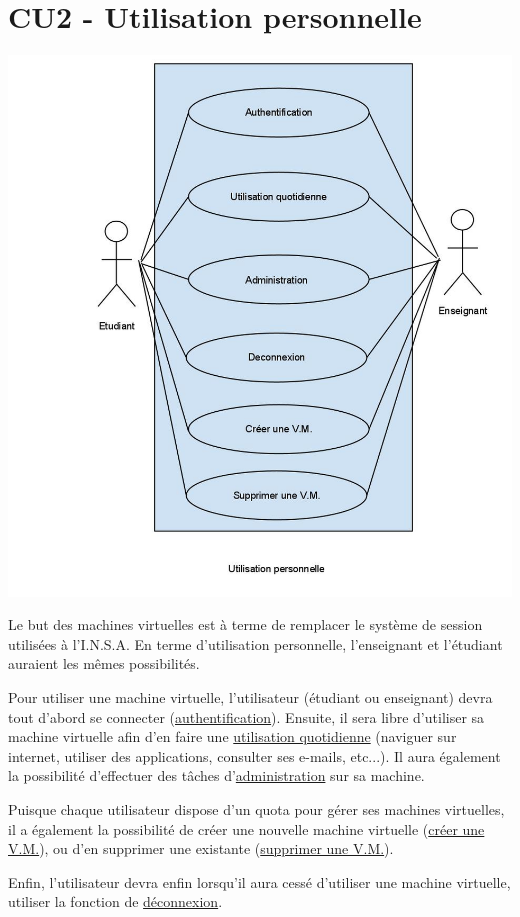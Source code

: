 \section{CU2 - Utilisation personnelle}

\includegraphics[scale=0.4]{CU2.jpg}

Le but des machines virtuelles est à terme de remplacer le système de session utilisées à l’I.N.S.A.
En terme d’utilisation personnelle, l’enseignant et l’étudiant auraient les mêmes possibilités.

Pour utiliser une machine virtuelle, l’utilisateur (étudiant ou enseignant) devra tout d’abord se connecter (\underline{authentification}). Ensuite, il sera libre d’utiliser sa machine virtuelle afin d’en faire une \underline{utilisation quotidienne} (naviguer sur internet, utiliser des applications, consulter ses e-mails, etc...). Il aura également la possibilité d’effectuer des tâches d’\underline{administration} sur sa machine.

Puisque chaque utilisateur dispose d’un quota pour gérer ses machines virtuelles, il a également la possibilité de créer une nouvelle machine virtuelle (\underline{créer une V.M.}), ou d’en supprimer une existante (\underline{supprimer une V.M.}).

Enfin, l’utilisateur devra enfin lorsqu’il aura cessé d’utiliser une machine virtuelle, utiliser la fonction de \underline{déconnexion}.
